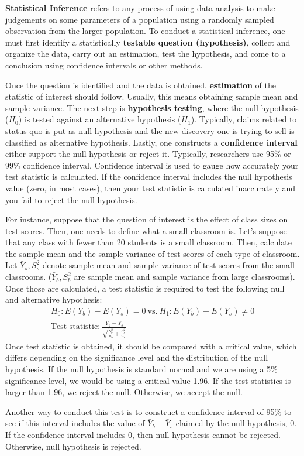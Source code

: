 \documentclass[12pt]{article}
\theoremstyle{definition}
\theoremstyle{property}
\theoremstyle{assumption}
\theoremstyle{example}
\theoremstyle{comment}
\begin{document}
\textbf{Statistical Inference} refers to any process of using data analysis to make judgements on some parameters of a population using a randomly sampled observation from the larger population. To conduct a statistical inference, one must first identify a statistically \textbf{testable question (hypothesis)}, collect and organize the data, carry out an estimation, test the hypothesis, and come to a conclusion using confidence intervals or other methods. \par\medskip
Once the question is identified and the data is obtained, \textbf{estimation} of the statistic of interest should follow. Usually, this means obtaining sample mean and sample variance. The next step is \textbf{hypothesis testing}, where the null hypothesis ($H_0$) is tested against an alternative hypothesis ($H_1$). Typically, claims related to status quo is put as null hypothesis and the new discovery one is trying to sell is classified as alternative hypothesis. Lastly, one constructs a \textbf{confidence interval} either support the null hypothesis or reject it. Typically, researchers use 95\% or 99\% confidence interval. Confidence interval is used to gauge how accurately your test statistic is calculated. If the confidence interval includes the null hypothesis value (zero, in most cases), then your test statistic is calculated inaccurately and you fail to reject the null hypothesis. \par\medskip
For instance, suppose that the question of interest is the effect of class sizes on test scores. Then, one needs to define what a small classroom is. Let's suppose that any class with fewer than 20 students is a small classroom. Then, calculate the sample mean and the sample variance of test scores of each type of classroom. Let $\bar{Y}_s,S^2_s$ denote sample mean and sample variance of test scores from the small classrooms. ($\bar{Y}_b, S^2_b$ are sample mean and sample variance from large classrooms). Once those are calculated, a test statistic is required to test the following null and alternative hypothesis:
\begin{gather*}
H_0: E(Y_b)-E(Y_s) = 0\ \text{vs.}\ H_1:E(Y_b)-E(Y_s) \neq 0\\
\text{Test statistic:} \ \frac{\bar{Y}_b-\bar{Y}_s}{\sqrt{\frac{S_b^2}{n_b}+\frac{S_s^2}{n_s}}}
\end{gather*}
Once test statistic is obtained, it should be compared with a critical value, which differs depending on the significance level and the distribution of the null hypothesis. If the null hypothesis is standard normal and we are using a 5\% significance level, we would be using a critical value 1.96. If the test statistics is larger than 1.96, we reject the null. Otherwise, we accept the null.
\par
 Another way to conduct this test is to construct a confidence interval of 95\% to see if this interval includes the value of 
$\bar{Y}_b-\bar{Y}_s$ claimed by the null hypothesis, 0. If the confidence interval includes 0, then null hypothesis cannot be rejected. Otherwise, null hypothesis is rejected.
\par\medskip
\end{document}
